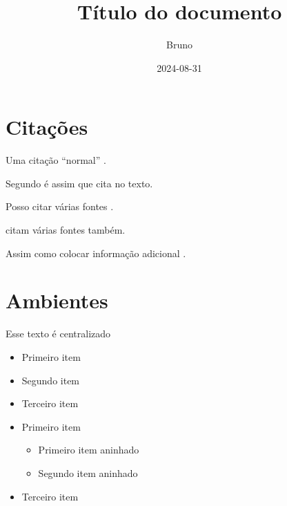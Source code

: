 \documentclass[dsc,male,12pt,a4paper]{ita}
\title{Título do documento}
\author{Bruno}
\date{2024-08-31}
\begin{document}
\frontmatter
\maketitle
\makecip

\tableofcontents

\mainmatter
\chapter{Citações}
Uma citação ``normal'' \cite{silvaBIM4DNo2019}.

Segundo \textcite{dynamoDynamoBIM} é assim que cita no texto.

Posso citar várias fontes \cites{nrelEnergyPlus2024,ronzaniEstudoITAPara2020}.

\textcites{wenProgressTrendBIM2021,autodeskNavisworks3DModel2024} citam várias fontes também.

Assim como colocar informação adicional \cite[pre][post]{pauwelsIFCtoRDF2024}.

\chapter{Ambientes}

\begin{center}
	Esse texto é centralizado
\end{center}

\begin{itemize}
	\item Primeiro item
	\item Segundo item
	\item Terceiro item
\end{itemize}

\begin{itemize}
	\item Primeiro item
	      \begin{itemize}
		      \item Primeiro item aninhado
		      \item Segundo item aninhado
	      \end{itemize}
	\item Terceiro item
\end{itemize}
\end{document}
